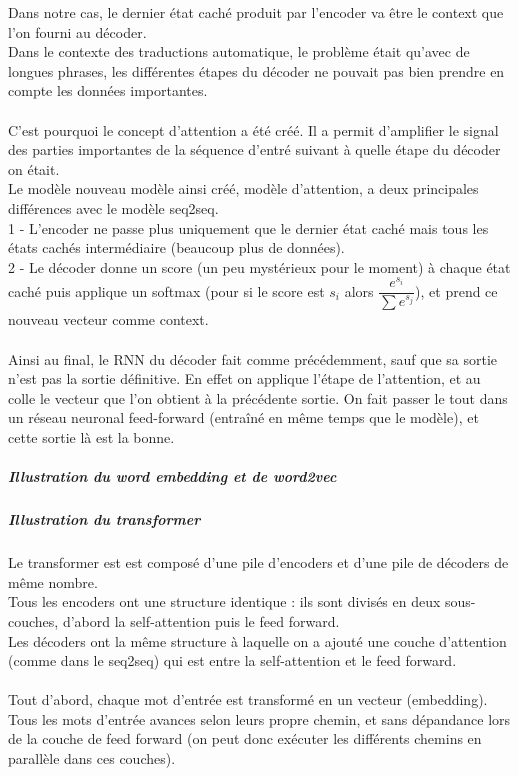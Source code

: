 \documentclass{article}
\begin{document}
Dans notre cas, le dernier état caché produit par l'encoder va être le context que l'on fourni au décoder.\\
Dans le contexte des traductions automatique, le problème était qu'avec de longues phrases, les différentes étapes du décoder ne pouvait pas bien prendre en compte les données importantes.\\\\
C'est pourquoi le concept d'attention a été créé. Il a permit d'amplifier le signal des parties importantes de la séquence d'entré suivant à quelle étape du décoder on était.\\
Le modèle nouveau modèle ainsi créé, modèle d'attention, a deux principales différences avec le modèle seq2seq.\\
1 - L'encoder ne passe plus uniquement que le dernier état caché mais tous les états cachés intermédiaire (beaucoup plus de données).\\
2 - Le décoder donne un score (un peu mystérieux pour le moment) à chaque état caché puis applique un softmax (pour si le score est $s_i$ alors $\dfrac{e^{s_i}}{\sum e^{s_j}}$), et prend ce nouveau vecteur comme context.\\\\
Ainsi au final, le RNN du décoder fait comme précédemment, sauf que sa sortie n'est pas la sortie définitive. En effet on applique l'étape de l'attention, et au colle le vecteur que l'on obtient à la précédente sortie. On fait passer le tout dans un réseau neuronal feed-forward (entraîné en même temps que le modèle), et cette sortie là est la bonne.
\subparagraph*{Illustration du word embedding et de word2vec}
\subparagraph*{Illustration du transformer}
Le transformer est est composé d'une pile d'encoders et d'une pile de décoders de même nombre.\\
Tous les encoders ont une structure identique : ils sont divisés en deux sous-couches, d'abord la self-attention puis le feed forward.\\
Les décoders ont la même structure à laquelle on a ajouté une couche d'attention (comme dans le seq2seq) qui est entre la self-attention et le feed forward.\\\\
Tout d'abord, chaque mot d'entrée est transformé en un vecteur (embedding). Tous les mots d'entrée avances selon leurs propre chemin, et sans dépandance lors de la couche de feed forward (on peut donc exécuter les différents chemins en parallèle dans ces couches).\\
\\
\end{document}

